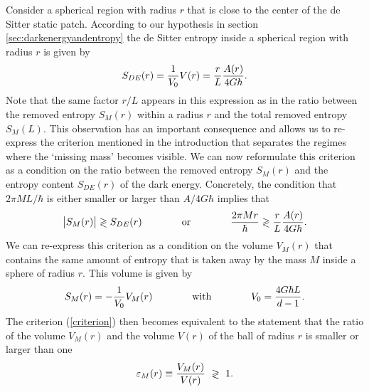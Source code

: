 \documentclass[a4paper,12pt]{article}
\newcommand{\be}{\begin{equation}}
\newcommand{\ee}{\end{equation}}
\begin{document}
Consider a spherical region with radius $r$ that is close to the center of the de Sitter static patch. According to our hypothesis in section \ref{sec:darkenergyandentropy} the  de Sitter entropy inside a spherical region with radius $r$  is given by  
\be
 \label{fracrS}
 S_{DE}(r)  = {1\over V_0} V(r) = {r\over L} {A(r)\over 4G\hbar}.
 \ee
 Note that the same factor $r/L$ appears in this expression as in the ratio between the removed entropy $S_M(r)$ within a radius $r$ and the total removed entropy $S_M(L)$. This observation has an important consequence and allows us to re-express the criterion mentioned in the introduction that separates the regimes where the `missing mass' becomes visible. We can now reformulate this criterion as a condition on the ratio between the removed entropy $S_M(r)$ and the entropy content $S_{DE}(r)$ of the dark energy. Concretely, the condition that $2\pi ML/\hbar$ is either 
 smaller or larger than $A/ 4G\hbar$ implies that 
\be
\label{criterion}
\big | S_M(r)  \big | \gtrless S_{DE}(r)\qquad\qquad{\mbox{or}} \qquad \qquad {2\pi M r\over \hbar}  \gtrless 
 {r\over L} {A(r)\over 4G\hbar} .
 \ee
 We can re-express this criterion as a condition on the volume $V_M(r)$ that contains the same amount of entropy that is taken away by the mass $M$ inside a sphere of radius $r$. This volume is given by
\be
\label{V0}
S_M(r) =-{1\over V_0} V_M(r)\qquad\qquad\mbox{with} \qquad\qquad V_0={4G\hbar L\over d-1}.
\ee
The criterion (\ref{criterion}) then becomes equivalent to the statement that the ratio 
of the volume $V_M(r)$ and the volume $V(r)$ of the ball of radius $r$ is smaller or larger than one 
\begin{equation}
\label{vareps}
\varepsilon_M(r) \equiv {V_M(r)\over V(r)} \ \gtrless \ 1	.
\end{equation}
\end{document}
